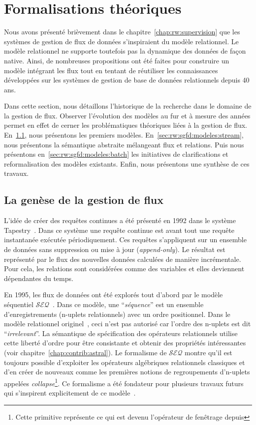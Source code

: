 \section{Formalisations théoriques}\label{sec:rw:sgfd:modeles}
Nous avons présenté brièvement dans le chapitre~\ref{chap:rw:supervision} que les systèmes de gestion de flux de données s'inspiraient du modèle relationnel. Le modèle relationnel ne supporte toutefois pas la dynamique des données de façon native. Ainsi, de nombreuses propositions ont été faites pour construire un modèle intégrant les flux tout en tentant de réutiliser les connaissances développées sur les systèmes de gestion de base de données relationnels depuis 40 ans.

Dans cette section, nous détaillons l'historique de la recherche dans le domaine de la gestion de flux. Observer l'évolution des modèles au fur et à mesure des années permet en effet de cerner les problématiques théoriques liées à la gestion de flux. En~\ref{sec:rw:sgfd:modeles:early}, nous présentons les premiers modèles. En~\ref{sec:rw:sgfd:modeles:stream}, nous présentons la sémantique abstraite mélangeant flux et relations. Puis nous présentons en~\ref{sec:rw:sgfd:modeles:batch} les initiatives de clarifications et reformalisation des modèles existants. Enfin, nous présentons une synthèse de ces travaux.

\subsection{La genèse de la gestion de flux}\label{sec:rw:sgfd:modeles:early}
L'idée de créer des requêtes continues a été présenté en 1992 dans le système Tapestry~\cite{Terry:tapestry}. Dans ce système une requête continue est avant tout une requête instantanée exécutée périodiquement. Ces requêtes s'appliquent sur un ensemble de données sans suppression ou mise à jour (\textit{append-only}). Le résultat est représenté par le flux des nouvelles données calculées de manière incrémentale. Pour cela, les relations sont considérées comme des variables et elles deviennent dépendantes du temps.

En 1995, les flux de données ont été explorés tout d'abord par le modèle séquentiel $\mathcal{SEQ}$~\cite{Seshadri:seq}. Dans ce modèle, une \enquote{\it séquence} est un ensemble d'enregistrements (n-uplets relationnels) avec un ordre positionnel. Dans le modèle relationnel originel~\cite{Codd:model}, ceci n'est pas autorisé car l'ordre des n-uplets est dit \enquote{\it irrelevant}. La sémantique de spécification des opérateurs relationnels utilise cette liberté d'ordre pour être consistante et obtenir des propriétés intéressantes (voir chapitre~\ref{chap:contrib:astral}). Le formalisme de $\mathcal{SEQ}$ montre qu'il est toujours possible d'exploiter les opérateurs algébriques relationnels classiques et d'en créer de nouveaux comme les premières notions de regroupements d'n-uplets appelées \textit{collapse}\footnote{Cette primitive représente ce qui est devenu l'opérateur de fenêtrage depuis}. Ce formalisme a été fondateur pour plusieurs travaux futurs qui s'inspirent explicitement de ce modèle~\cite{Gurgen:sstreamware,Babcock:issues}.

